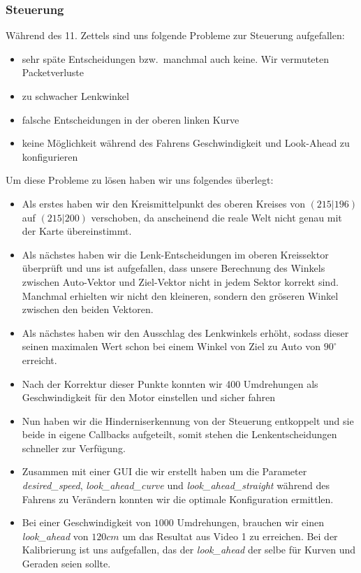 \documentclass[10pt,oneside,a4paper]{article}
\begin{document}
      \subsubsection{Steuerung}
        W\"ahrend des 11. Zettels sind uns folgende Probleme zur Steuerung aufgefallen:
        \begin{itemize}
          \item sehr sp\"ate Entscheidungen bzw.\ manchmal auch keine. Wir vermuteten Packetverluste
          \item zu schwacher Lenkwinkel
          \item falsche Entscheidungen in der oberen linken Kurve
          \item keine M\"oglichkeit w\"ahrend des Fahrens Geschwindigkeit und Look-Ahead zu
            konfigurieren
        \end{itemize}
        Um diese Probleme zu lösen haben wir uns folgendes überlegt:
        \begin{itemize}
            \item Als erstes haben wir den Kreismittelpunkt des oberen Kreises von $(215|196)$ auf $(215|200)$
            verschoben, da anscheinend die reale Welt nicht genau mit der Karte \"ubereinstimmt.
            \item Als n\"achstes haben wir die Lenk-Entscheidungen im oberen Kreissektor \"uberpr\"uft und uns ist aufgefallen, dass unsere Berechnung des Winkels zwischen Auto-Vektor und Ziel-Vektor nicht
            in jedem Sektor korrekt sind. Manchmal erhielten wir nicht den kleineren, sondern den
            gr\"oseren Winkel zwischen den beiden Vektoren.
            \item Als n\"achstes haben wir den Ausschlag des Lenkwinkels erh\"oht, sodass dieser seinen
            maximalen Wert schon bei einem Winkel von Ziel zu Auto von $90^\circ$ erreicht.
            \item Nach der Korrektur dieser Punkte konnten wir 400 Umdrehungen als Geschwindigkeit
            f\"ur den Motor einstellen und sicher fahren
            \item Nun haben wir die Hinderniserkennung von der Steuerung entkoppelt und sie beide in eigene
            Callbacks aufgeteilt, somit stehen die Lenkentscheidungen schneller zur Verf\"ugung.
            \item Zusammen mit einer GUI die wir erstellt haben um die Parameter \emph{desired\_speed},
            \emph{look\_ahead\_curve} und \emph{look\_ahead\_straight} w\"ahrend des Fahrens zu
            Ver\"andern konnten wir die optimale Konfiguration ermittlen.
            \item Bei einer Geschwindigkeit von $1000$ Umdrehungen, brauchen wir einen \emph{look\_ahead} von
            $120cm$ um das Resultat aus Video 1 zu erreichen. Bei der Kalibrierung ist uns aufgefallen,
            das der \emph{look\_ahead} der selbe f\"ur Kurven und Geraden seien sollte.
        \end{itemize}
        
\end{document}
